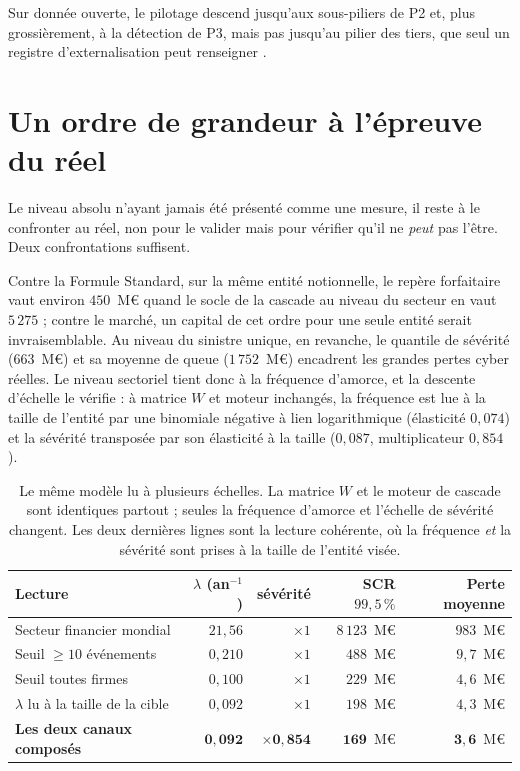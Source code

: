 Sur donnée ouverte, le pilotage descend jusqu'aux sous-piliers de P2 et, plus grossièrement, à
la détection de P3, mais pas jusqu'au pilier des tiers, que seul un registre d'externalisation
peut renseigner \matcomp.

\section{Un ordre de grandeur à l'épreuve du réel}
\label{sec:ancrage}

Le niveau absolu n'ayant jamais été présenté comme une mesure, il reste à le confronter au
réel, non pour le valider mais pour vérifier qu'il ne \emph{peut} pas l'être. Deux
confrontations suffisent.

Contre la Formule Standard, sur la même entité notionnelle, le repère forfaitaire vaut environ
$450$~M\euro{} quand le socle de la cascade au niveau du secteur en vaut $5\,275$ ; contre le
marché, un capital de cet ordre pour une seule entité serait invraisemblable. Au niveau du
sinistre unique, en revanche, le quantile de sévérité ($663$~M\euro) et sa moyenne de queue
($1\,752$~M\euro) encadrent les grandes pertes cyber réelles. Le niveau sectoriel tient donc à la
fréquence d'amorce, et la descente d'échelle le vérifie : à matrice $W$ et moteur inchangés, la
fréquence est lue à la taille de l'entité par une binomiale négative à lien logarithmique
(élasticité $0{,}074$) et la sévérité transposée par son élasticité à la taille ($0{,}087$,
multiplicateur $0{,}854$).

\begin{table}[htbp]\centering
\small
\begin{tabular}{lrrrr}
\toprule
Lecture & $\lambda$ (an$^{-1}$) & sévérité & SCR $99{,}5\,\%$ & Perte moyenne \\
\midrule
Secteur financier mondial & $21{,}56$ & $\times 1$ & $8\,123$~M\euro & $983$~M\euro \\
Seuil \og{}$\geq 10$ événements\fg{} & $0{,}210$ & $\times 1$ & $488$~M\euro & $9{,}7$~M\euro \\
Seuil \og{}toutes firmes\fg{} & $0{,}100$ & $\times 1$ & $229$~M\euro & $4{,}6$~M\euro \\
$\lambda$ lu à la taille de la cible & $0{,}092$ & $\times 1$ & $198$~M\euro & $4{,}3$~M\euro \\
\textbf{Les deux canaux composés} & $\mathbf{0{,}092}$ & $\mathbf{\times 0{,}854}$ &
$\mathbf{169}$~M\euro & $\mathbf{3{,}6}$~M\euro \\
\bottomrule
\end{tabular}
\caption{Le même modèle lu à plusieurs échelles. La matrice $W$ et le moteur de cascade sont
identiques partout ; seules la fréquence d'amorce et l'échelle de sévérité changent. Les deux
dernières lignes sont la lecture cohérente, où la fréquence \emph{et} la sévérité sont prises
à la taille de l'entité visée.}
\label{tab:echelle}
\end{table}

